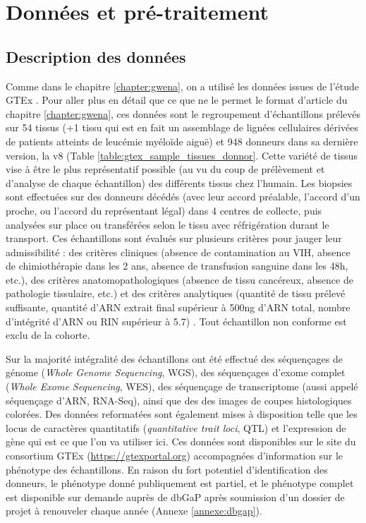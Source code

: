 \section{Données et pré-traitement}

\subsection{Description des données}

Comme dans le chapitre \ref{chapter:gwena}, on a utilisé les données issues de l'étude GTEx \cite{Ardlie2015}. Pour aller plus en détail que ce que ne le permet le format d'article du chapitre \ref{chapter:gwena}, ces données sont le regroupement d'échantillons prélevés sur 54 tissus (+1 tissu qui est en fait un assemblage de lignées cellulaires dérivées de patients atteints de leucémie myéloïde aiguë\cite{Way2020}) et 948 donneurs dans sa dernière version, la v8 (Table \ref{table:gtex_sample_tissues_donnor}. Cette variété de tissus vise à être le plus représentatif possible (au vu du coup de prélèvement et d'analyse de chaque échantillon) des différents tissus chez l'humain. Les biopsies sont effectuées sur des donneurs décédés (avec leur accord préalable, l'accord d'un proche, ou l'accord du représentant légal) dans 4 centres de collecte, puis analysées sur place ou transférées selon le tissu avec réfrigération durant le transport. Ces échantillons sont évalués sur plusieurs critères pour jauger leur admissibilité : des critères cliniques (absence de contamination au VIH, absence de chimiothérapie dans les 2 ans, absence de transfusion sanguine dans les 48h, etc.), des critères anatomopathologiques (absence de tissu cancéreux, absence de pathologie tissulaire, etc.) et des critères analytiques (quantité de tissu prélevé suffisante, quantité d'ARN extrait final supérieur à 500ng d'ARN total, nombre d'intégrité d'ARN ou RIN supérieur à 5.7) \cite{Carithers2015}. Tout échantillon non conforme est exclu de la cohorte.

Sur la majorité intégralité des échantillons ont été effectué des séquençages de génome (\textit{Whole Genome Sequencing}, WGS), des séquençages d'exome complet (\textit{Whole Exome Sequencing}, WES), des séquençage de transcriptome (aussi appelé séquençage d'ARN, RNA-Seq), ainsi que des des images de coupes histologiques colorées. Des données reformatées sont également mises à disposition telle que les locus de caractères quantitatifs (\textit{quantitative trait loci}, QTL) et l'expression de gène qui est ce que l'on va utiliser ici. Ces données sont disponibles sur le site du consortium GTEx (\url{https://gtexportal.org}) accompagnées d'information sur le phénotype des échantillons. En raison du fort potentiel d'identification des donneurs, le phénotype donné publiquement est partiel, et le phénotype complet est disponible sur demande auprès de dbGaP après soumission d'un dossier de projet à renouveler chaque année (Annexe \ref{annexe:dbgap}).

